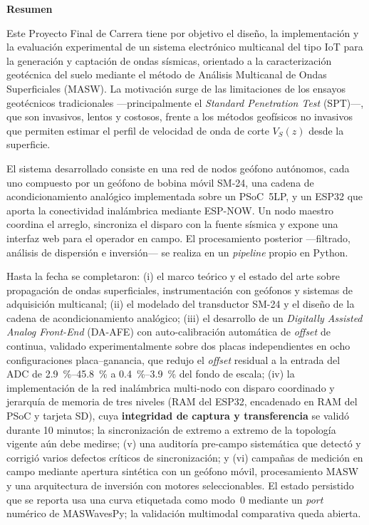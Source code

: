 \vspace{0.4cm}
\begin{center}\textbf{\large Resumen}\end{center}

\noindent
Este Proyecto Final de Carrera tiene por objetivo el dise\~no, la implementaci\'on y la
evaluaci\'on experimental de un sistema electr\'onico multicanal del tipo IoT para la
generaci\'on y captaci\'on de ondas s\'ismicas, orientado a la caracterizaci\'on geot\'ecnica
del suelo mediante el m\'etodo de An\'alisis Multicanal de Ondas Superficiales (MASW).
La motivaci\'on surge de las limitaciones de los ensayos geot\'ecnicos tradicionales
---principalmente el \emph{Standard Penetration Test} (SPT)---, que son invasivos,
lentos y costosos, frente a los m\'etodos geof\'isicos no invasivos que permiten estimar
el perfil de velocidad de onda de corte $V_S(z)$ desde la superficie.

El sistema desarrollado consiste en una red de nodos ge\'ofono aut\'onomos, cada uno
compuesto por un ge\'ofono de bobina m\'ovil SM-24, una cadena de acondicionamiento
anal\'ogico implementada sobre un PSoC~5LP, y un ESP32 que aporta la conectividad
inal\'ambrica mediante ESP-NOW. Un nodo maestro coordina el arreglo, sincroniza el
disparo con la fuente s\'ismica y expone una interfaz web para el operador en campo.
El procesamiento posterior ---filtrado, an\'alisis de dispersi\'on e inversi\'on---
se realiza en un \emph{pipeline} propio en Python.

Hasta la fecha se completaron: (i) el marco te\'orico y el estado del arte sobre
propagaci\'on de ondas superficiales, instrumentaci\'on con ge\'ofonos y sistemas de
adquisici\'on multicanal; (ii) el modelado del transductor SM-24 y el dise\~no de la
cadena de acondicionamiento anal\'ogico; (iii) el desarrollo de un
\emph{Digitally Assisted Analog Front-End} (DA-AFE) con auto-calibraci\'on autom\'atica
de \emph{offset} de continua, validado experimentalmente sobre dos placas
independientes en ocho configuraciones placa--ganancia, que redujo el \emph{offset}
residual a la entrada del ADC de \SIrange{2.9}{45.8}{\percent} a
\SIrange{0.4}{3.9}{\percent} del fondo de escala; (iv) la implementaci\'on de la red
inal\'ambrica multi-nodo con disparo coordinado y jerarqu\'ia de memoria de tres
niveles (RAM del ESP32, encadenado en RAM del PSoC y tarjeta SD), cuya
\textbf{integridad de captura y transferencia} se valid\'o durante 10 minutos; la
sincronizaci\'on de extremo a extremo de la topolog\'ia vigente a\'un debe medirse; (v) una auditor\'ia pre-campo sistem\'atica que
detect\'o y corrigi\'o varios defectos cr\'iticos de sincronizaci\'on; y (vi) campa\~nas de
medici\'on en campo mediante apertura sint\'etica con un ge\'ofono m\'ovil, procesamiento
MASW y una arquitectura de inversi\'on con motores seleccionables. El estado persistido
que se reporta usa una curva etiquetada como modo~0 mediante un
\emph{port} num\'erico de MASWavesPy; la validaci\'on multimodal comparativa queda abierta.

